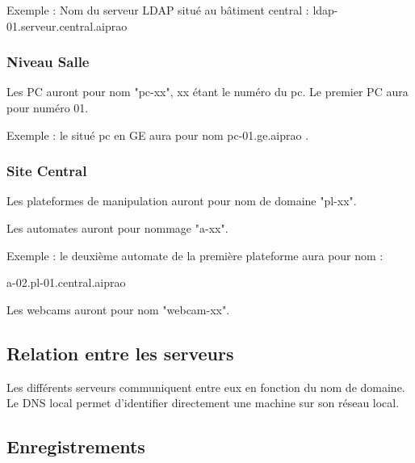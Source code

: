 Exemple : Nom du serveur LDAP situé au bâtiment central : ldap-01.serveur.central.aiprao

\subsubsection{Niveau Salle}

Les PC auront pour nom "pc-xx", xx étant le numéro du pc. Le premier PC aura 
pour numéro 01.

Exemple : le situé pc en GE aura pour nom pc-01.ge.aiprao .

\subsubsection{Site Central}

Les plateformes de manipulation auront pour nom de domaine "pl-xx".

Les automates auront pour nommage "a-xx". 

Exemple : le deuxième automate de la première plateforme aura pour nom : 

a-02.pl-01.central.aiprao

Les webcams auront pour nom "webcam-xx".

\subsection{Relation entre les serveurs}

Les différents serveurs communiquent entre eux en fonction du nom de domaine. 
Le DNS local permet d'identifier directement une machine sur son réseau local.


\subsection{Enregistrements}


